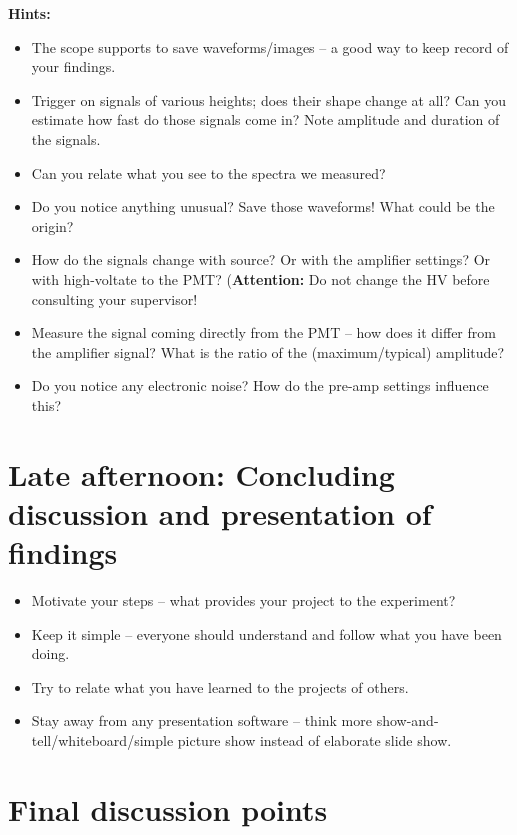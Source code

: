 \documentclass[a4,11pt, notitlepage]{article}
\begin{document}
\noindent\textbf{Hints:}
\begin{itemize}
\item The scope supports to save waveforms/images -- a good way to
  keep record of your findings.
\item Trigger on signals of various heights; does their shape change
  at all? Can you estimate how fast do those signals come in? Note
  amplitude and duration of the signals.
\item Can you relate what you see to
the spectra we measured?
\item Do you notice anything unusual? Save those waveforms! What could
  be the origin?
\item How do the signals change with source? Or with the amplifier
  settings? Or with high-voltate to the
  PMT? (\textbf{Attention:} Do not change the HV before consulting
  your supervisor!
\item Measure the signal coming directly from the PMT -- how does it
  differ from the amplifier signal? What is the ratio of the
  (maximum/typical) amplitude?
\item Do you notice any electronic noise? How do the pre-amp settings
  influence this?
\end{itemize}


\section{Late afternoon: Concluding discussion and presentation of findings}
\label{sec:final-presentation}

\begin{itemize}
\item Motivate your steps -- what provides your project to the experiment?
\item Keep it simple -- everyone should understand and follow what you
  have been doing.
\item Try to relate what you have learned to the projects of
  others.
\item Stay away from any presentation software -- think more
  show-and-tell/whiteboard/simple picture show instead of elaborate slide show.

\end{itemize}

\appendix

\section{Final discussion points}
\label{sec:further-discussion}
\end{document}

